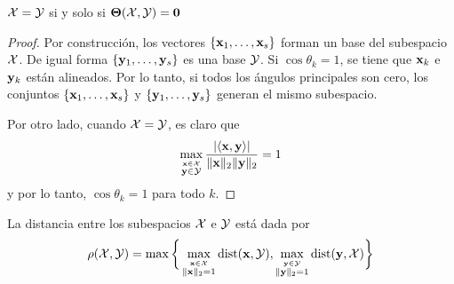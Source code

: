 \begin{lemma}\label{Lemma:Angulos}
		$\mathcal{X} = \mathcal{Y}$ si y solo si $\boldsymbol{\Theta}(\mathcal{X},\mathcal{Y}) = \mathbf{0}$
	\end{lemma}
	\begin{proof}
		Por construcción, los vectores $\{\mathbf{x}_1,\ldots,\mathbf{x}_s\}$ forman un base del subespacio $\mathcal{X}$. De igual forma $\{\mathbf{y}_1,\ldots,\mathbf{y}_s\}$ es una base $\mathcal{Y}$. Si $\cos\theta_k=1$, se tiene que $\mathbf{x}_k$ e $\mathbf{y}_k$ están alineados. Por lo tanto, si todos los ángulos principales son cero, los conjuntos  $\{\mathbf{x}_1,\ldots,\mathbf{x}_s\}$ y $\{\mathbf{y}_1,\ldots,\mathbf{y}_s\}$ generan el mismo subespacio.
		
		Por otro lado, cuando $\mathcal{X}=\mathcal{Y}$, es claro que 
		\[\max_{\stackrel{\mathbf{x}\in\mathcal{X}}{\mathbf{y}\in\mathcal{Y}}}\frac{|\langle\mathbf{x},\mathbf{y}\rangle|}{\|\mathbf{x}\|_2\|\mathbf{y}\|_2} = 1\]
		y por lo tanto, $\cos\theta_k = 1$ para todo $k$.
	\end{proof}
	
	\begin{definition}
		La distancia entre los subespacios $\mathcal{X}$ e $\mathcal{Y}$ está dada por
		\begin{equation}
			\rho(\mathcal{X},\mathcal{Y}) = \max\bigg\{\max_{\stackrel{\mathbf{x}\in\mathcal{X}}{\|\mathbf{x}\|_2=1}}\mathrm{dist}(\mathbf{x},\mathcal{Y}),\max_{\stackrel{\mathbf{y}\in\mathcal{Y}}{\|\mathbf{y}\|_2=1}}\mathrm{dist}(\mathbf{y},\mathcal{X}) \bigg\}
			\label{Eq:GapDistance}
		\end{equation}
	\end{definition}
	
